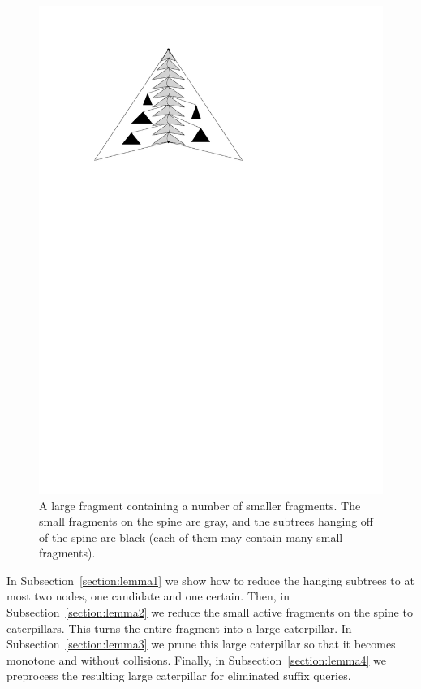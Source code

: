 \documentclass[11pt,a4paper]{article}
\theoremstyle{definition}
\theoremstyle{remark}
\begin{document}
\begin{figure}[h]
\begin{center}
\includegraphics[scale=1]{refinement}
\end{center}
\caption{A large fragment containing a number of smaller fragments. The small fragments on the spine are gray, and the subtrees hanging off of the spine are black (each of them may contain many small fragments). %
\label{figure of small fragments inside a large fragment}}
\end{figure}


\noindent In Subsection~\ref{section:lemma1} we show how to reduce the hanging subtrees to at most two nodes, one candidate and one certain. Then, in Subsection~\ref{section:lemma2} we reduce the small active fragments on the spine to caterpillars. This turns the entire fragment into a large caterpillar. In Subsection~\ref{section:lemma3} we prune this large caterpillar so that it becomes monotone and without collisions. Finally, in Subsection~\ref{section:lemma4} we preprocess the resulting large caterpillar for eliminated suffix queries. 
\end{document}
